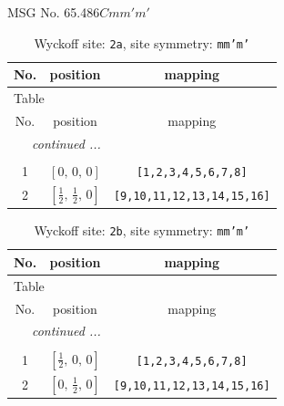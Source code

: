 \documentclass[fleqn,8pt]{jsarticle}
\begin{document}
\setcounter{MaxMatrixCols}{32}

\renewcommand{\tablename}{Table~}
\renewcommand{\figurename}{Figure~}
\begin{center}
\LARGE
MSG No. 65.486\quad$Cmm'm'$
\end{center}
\renewcommand{\arraystretch}{1.2}
\begin{longtable}{ccc}
\caption{Wyckoff site: {\tt 2a}, site symmetry: {\tt mm'm'}}
 \\
 \hline \hline
No. & position & mapping \\ \hline \endfirsthead

\multicolumn{2}{l}{\tablename\ \thetable{}} \\
 \hline \hline
No. & position & mapping \\ \hline \endhead

 \hline \hline
\multicolumn{2}{r}{\footnotesize\it continued ...} \\ \endfoot

 \hline \hline
\multicolumn{2}{r}{} \\ \endlastfoot

1 & $\left[ 0,\, 0,\, 0 \right]$ & {\tt [1,2,3,4,5,6,7,8]} \\ \hline
2 & $\left[ \frac{1}{2},\, \frac{1}{2},\, 0 \right]$ & {\tt [9,10,11,12,13,14,15,16]} \\
\end{longtable}
\renewcommand{\arraystretch}{1.2}
\begin{longtable}{ccc}
\caption{Wyckoff site: {\tt 2b}, site symmetry: {\tt mm'm'}}
 \\
 \hline \hline
No. & position & mapping \\ \hline \endfirsthead

\multicolumn{2}{l}{\tablename\ \thetable{}} \\
 \hline \hline
No. & position & mapping \\ \hline \endhead

 \hline \hline
\multicolumn{2}{r}{\footnotesize\it continued ...} \\ \endfoot

 \hline \hline
\multicolumn{2}{r}{} \\ \endlastfoot

1 & $\left[ \frac{1}{2},\, 0,\, 0 \right]$ & {\tt [1,2,3,4,5,6,7,8]} \\ \hline
2 & $\left[ 0,\, \frac{1}{2},\, 0 \right]$ & {\tt [9,10,11,12,13,14,15,16]} \\
\end{longtable}
\end{document}
